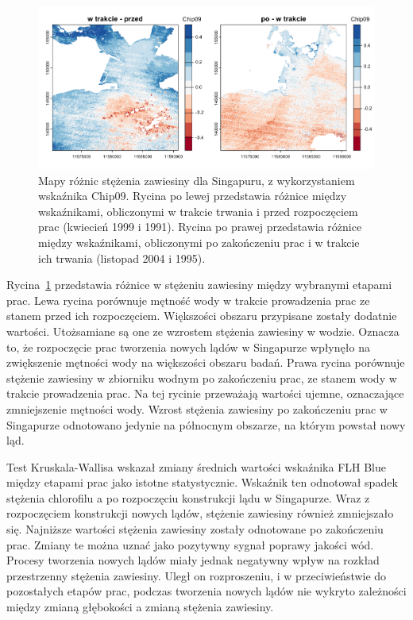 \documentclass{amuthesis}
\begin{document}
\begin{figure}[t]

{\centering \includegraphics[width=6.25in,height=\textheight]{figures/singapore/chip_diff.png}

}

\caption{\label{fig-sg_chip_diff}Mapy różnic stężenia zawiesiny dla
Singapuru, z wykorzystaniem wskaźnika Chip09. Rycina po lewej
przedstawia różnice między wskaźnikami, obliczonymi w trakcie trwania i
przed rozpoczęciem prac (kwiecień 1999 i 1991). Rycina po prawej
przedstawia różnice między wskaźnikami, obliczonymi po zakończeniu prac
i w trakcie ich trwania (listopad 2004 i 1995).}

\end{figure}

Rycina~\ref{fig-sg_chip_diff} przedstawia różnice w stężeniu zawiesiny
między wybranymi etapami prac. Lewa rycina porównuje mętność wody w
trakcie prowadzenia prac ze stanem przed ich rozpoczęciem. Większości
obszaru przypisane zostały dodatnie wartości. Utożsamiane są one ze
wzrostem stężenia zawiesiny w wodzie. Oznacza to, że rozpoczęcie prac
tworzenia nowych lądów w Singapurze wpłynęło na zwiększenie mętności
wody na większości obszaru badań. Prawa rycina porównuje stężenie
zawiesiny w zbiorniku wodnym po zakończeniu prac, ze stanem wody w
trakcie prowadzenia prac. Na tej rycinie przeważają wartości ujemne,
oznaczające zmniejszenie mętności wody. Wzrost stężenia zawiesiny po
zakończeniu prac w Singapurze odnotowano jedynie na północnym obszarze,
na którym powstał nowy ląd.

Test Kruskala-Wallisa wskazał zmiany średnich wartości wskaźnika FLH
Blue między etapami prac jako istotne statystycznie. Wskaźnik ten
odnotował spadek stężenia chlorofilu a po rozpoczęciu konstrukcji lądu w
Singapurze. Wraz z rozpoczęciem konstrukcji nowych lądów, stężenie
zawiesiny również zmniejszało się. Najniższe wartości stężenia zawiesiny
zostały odnotowane po zakończeniu prac. Zmiany te można uznać jako
pozytywny sygnał poprawy jakości wód. Procesy tworzenia nowych lądów
miały jednak negatywny wpływ na rozkład przestrzenny stężenia zawiesiny.
Uległ on rozproszeniu, i w przeciwieństwie do pozostałych etapów prac,
podczas tworzenia nowych lądów nie wykryto zależności między zmianą
głębokości a zmianą stężenia zawiesiny.
\end{document}
